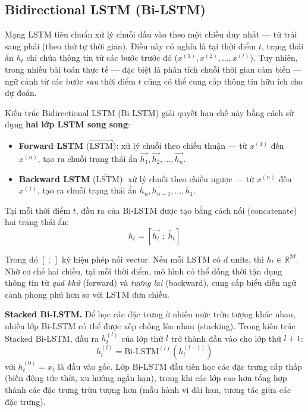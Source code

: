 \subsection{Bidirectional LSTM (Bi-LSTM)}
\label{subsec:bilstm}

Mạng LSTM tiêu chuẩn xử lý chuỗi đầu vào theo một chiều duy nhất — từ trái sang phải (theo thứ tự thời gian). Điều này có nghĩa là tại thời điểm $t$, trạng thái ẩn $h_t$ chỉ chứa thông tin từ các bước trước đó ($x^{(1)}, x^{(2)}, \dots, x^{(t)}$). Tuy nhiên, trong nhiều bài toán thực tế — đặc biệt là phân tích chuỗi thời gian cảm biến — ngữ cảnh từ các bước \textit{sau} thời điểm $t$ cũng có thể cung cấp thông tin hữu ích cho dự đoán.

Kiến trúc Bidirectional LSTM (Bi-LSTM) \cite{schuster1997bidirectional} giải quyết hạn chế này bằng cách sử dụng \textbf{hai lớp LSTM song song}:
\begin{itemize}
    \item \textbf{Forward LSTM} ($\overrightarrow{\text{LSTM}}$): xử lý chuỗi theo chiều thuận — từ $x^{(1)}$ đến $x^{(n)}$, tạo ra chuỗi trạng thái ẩn $\overrightarrow{h_1}, \overrightarrow{h_2}, \dots, \overrightarrow{h_n}$.
    \item \textbf{Backward LSTM} ($\overleftarrow{\text{LSTM}}$): xử lý chuỗi theo chiều ngược — từ $x^{(n)}$ đến $x^{(1)}$, tạo ra chuỗi trạng thái ẩn $\overleftarrow{h_n}, \overleftarrow{h_{n-1}}, \dots, \overleftarrow{h_1}$.
\end{itemize}

Tại mỗi thời điểm $t$, đầu ra của Bi-LSTM được tạo bằng cách nối (concatenate) hai trạng thái ẩn:
\begin{equation}
    h_t = [\overrightarrow{h_t} \; ; \; \overleftarrow{h_t}]
\end{equation}

Trong đó $[\ ;\ ]$ ký hiệu phép nối vector. Nếu mỗi LSTM có $d$ units, thì $h_t \in \mathbb{R}^{2d}$. Nhờ cơ chế hai chiều, tại mỗi thời điểm, mô hình có thể đồng thời tận dụng thông tin từ \textit{quá khứ} (forward) và \textit{tương lai} (backward), cung cấp biểu diễn ngữ cảnh phong phú hơn so với LSTM đơn chiều.

\textbf{Stacked Bi-LSTM.} Để học các đặc trưng ở nhiều mức trừu tượng khác nhau, nhiều lớp Bi-LSTM có thể được xếp chồng lên nhau (stacking). Trong kiến trúc Stacked Bi-LSTM, đầu ra $h_t^{(l)}$ của lớp thứ $l$ trở thành đầu vào cho lớp thứ $l+1$:
\begin{equation}
    h_t^{(l)} = \text{Bi-LSTM}^{(l)}(h_t^{(l-1)})
\end{equation}
với $h_t^{(0)} = x_t$ là đầu vào gốc. Lớp Bi-LSTM đầu tiên học các đặc trưng cấp thấp (biến động tức thời, xu hướng ngắn hạn), trong khi các lớp cao hơn tổng hợp thành các đặc trưng trừu tượng hơn (mẫu hành vi dài hạn, tương tác giữa các đặc trưng).

